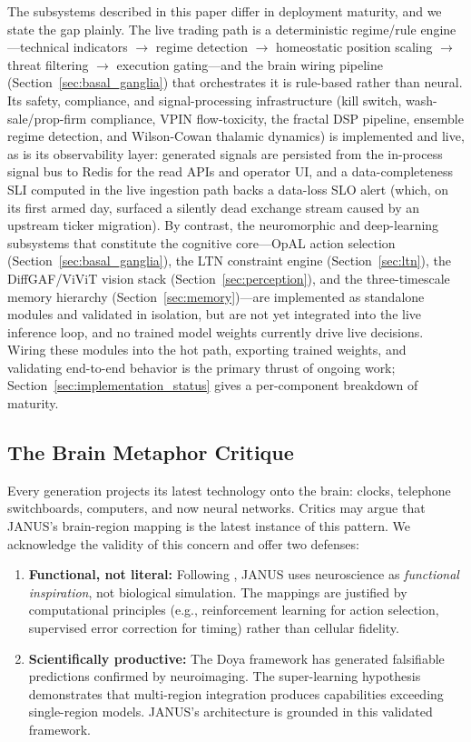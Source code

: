 \documentclass[12pt, a4paper]{article}
\begin{document}
The subsystems described in this paper differ in deployment maturity, and we state the gap plainly. The live trading path is a deterministic regime/rule engine---technical indicators $\rightarrow$ regime detection $\rightarrow$ homeostatic position scaling $\rightarrow$ threat filtering $\rightarrow$ execution gating---and the brain wiring pipeline (Section~\ref{sec:basal_ganglia}) that orchestrates it is rule-based rather than neural. Its safety, compliance, and signal-processing infrastructure (kill switch, wash-sale/prop-firm compliance, VPIN flow-toxicity, the fractal DSP pipeline, ensemble regime detection, and Wilson-Cowan thalamic dynamics) is implemented and live, as is its observability layer: generated signals are persisted from the in-process signal bus to Redis for the read APIs and operator UI, and a data-completeness SLI computed in the live ingestion path backs a data-loss SLO alert (which, on its first armed day, surfaced a silently dead exchange stream caused by an upstream ticker migration). By contrast, the neuromorphic and deep-learning subsystems that constitute the cognitive core---OpAL action selection (Section~\ref{sec:basal_ganglia}), the LTN constraint engine (Section~\ref{sec:ltn}), the DiffGAF/ViViT vision stack (Section~\ref{sec:perception}), and the three-timescale memory hierarchy (Section~\ref{sec:memory})---are implemented as standalone modules and validated in isolation, but are not yet integrated into the live inference loop, and no trained model weights currently drive live decisions. Wiring these modules into the hot path, exporting trained weights, and validating end-to-end behavior is the primary thrust of ongoing work; Section~\ref{sec:implementation_status} gives a per-component breakdown of maturity.

\subsection{The Brain Metaphor Critique}

Every generation projects its latest technology onto the brain: clocks, telephone switchboards, computers, and now neural networks. Critics may argue that JANUS's brain-region mapping is the latest instance of this pattern. We acknowledge the validity of this concern and offer two defenses:

\begin{enumerate}
	\item \textbf{Functional, not literal:} Following \citet{hassabis2017neuroscience}, JANUS uses neuroscience as \textit{functional inspiration}, not biological simulation. The mappings are justified by computational principles (e.g., reinforcement learning for action selection, supervised error correction for timing) rather than cellular fidelity.
	\item \textbf{Scientifically productive:} The Doya framework \citep{doya1999computations} has generated falsifiable predictions confirmed by neuroimaging. The super-learning hypothesis \citep{caligiore2019superlearning} demonstrates that multi-region integration produces capabilities exceeding single-region models. JANUS's architecture is grounded in this validated framework.
\end{enumerate}
\end{document}

